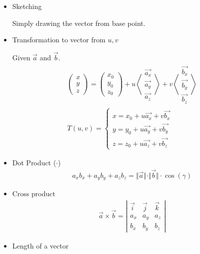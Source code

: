 \documentclass{article}
\begin{document}
\begin{itemize}
\item Sketching

Simply drawing the vector from base point.
\item Transformation to vector from $u,v$

Given $\vec{a}$ and $\vec{b}$.
\begin{gather*}
\left(\begin{array}{ccc}
x \\ y \\ z
\end{array}\right) = 
\left(\begin{array}{ccc}
x_{0} \\ y_{0} \\ z_{0}
\end{array}\right) + u
\left<\begin{array}{ccc}
\vec{a_{x}} \\ \vec{a_{y}} \\ \vec{a_{z}}
\end{array}\right> + v
\left<\begin{array}{ccc}
\vec{b_{x}} \\ \vec{b_{y}} \\ \vec{b_{z}}
\end{array}\right> \\
T(u,v) = \left\{\begin{array}{ccc}
x = x_{0} + u \vec{a_{x}} + v \vec{b_{x}} \\
y = y_{0} + u \vec{a_{y}} + v \vec{b_{y}} \\
z = z_{0} + u \vec{a_{z}} + v \vec{b_{z}}
\end{array}
\right.
\end{gather*}
\item Dot Product ($\cdot$)
\begin{gather*}
a_x b_x + a_y b_y + a_z b_z = 
\Vert\vec{a}\Vert \cdot \Vert\vec{b}\Vert \cdot \cos (\gamma)
\end{gather*}
\item Cross product
\begin{gather*}
\vec{a}\times\vec{b} = \left|\begin{array}{ccc}
\vec{i} & \vec{j} & \vec{k} \\
a_x & a_y & a_z \\
b_x & b_y & b_z
\end{array}\right|
\end{gather*}
\item Length of a vector
\begin{gather*}

\end{gather*}
\end{itemize}
\end{document}
